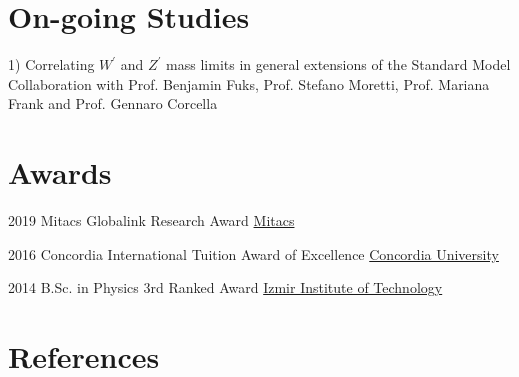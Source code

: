 \documentclass[]{friggeri-cv}
\begin{document}
\section{On-going Studies}

\begin{entrylist}
	
	\entrySuperLong
{1)}
{Correlating $W^\prime$ and $Z^\prime$ mass limits in general extensions of the Standard Model}
{Collaboration with Prof. Benjamin Fuks, Prof. Stefano Moretti, Prof. Mariana Frank and Prof. Gennaro Corcella}
{\href{https://www.mitacs.ca/en/programs/globalink/globalink-research-award}{}} 
	
\end{entrylist}	




\section{Awards}

\begin{entrylist}
	
\entryp
{2019}
{Mitacs Globalink Research Award}
{\href{https://www.mitacs.ca/en/programs/globalink/globalink-research-award}{Mitacs}} 	
	

\entryp
{2016}
{Concordia International Tuition Award of Excellence}
{\href{http://www.concordia.ca}{Concordia University}} 	


\entryp
{2014}
{B.Sc. in Physics 3rd Ranked Award}
{\href{http://www.iyte.edu.tr/AnaSayfa.aspx?d=ENG}{Izmir Institute of Technology}} 	
	
	
\end{entrylist}	

\newpage	

\section{References}
	
\end{document}
